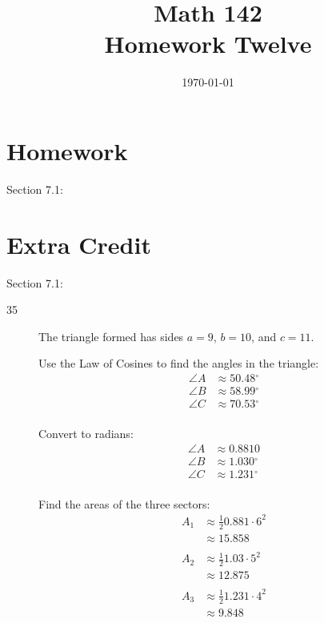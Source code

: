 \documentclass{exam}
\author{}
\date{\today}
\title{Math 142 \\ Homework Twelve}
\newcommand{\dg}{\ensuremath{^\circ}}
\begin{document}
  \maketitle

  \section{Homework}
  Section 7.1: 

  \section{Extra Credit}
  Section 7.1: 

  \ifprintanswers

    \begin{description}
      \item[35]
        The triangle formed has sides $a = 9$, $b = 10$, and $c = 11$.

        Use the Law of Cosines to find the angles in the triangle:
        \begin{align*}
          \angle A & \approx 50.48 \dg \\
          \angle B & \approx 58.99 \dg \\
          \angle C & \approx 70.53 \dg \\
        \end{align*}

        Convert to radians:
        \begin{align*}
          \angle A & \approx 0.8810 \\
          \angle B & \approx 1.030 \dg \\
          \angle C & \approx 1.231 \dg \\
        \end{align*}

        Find the areas of the three sectors:
        \begin{align*}
          A_1 & \approx \frac{1}{2} 0.881 \cdot 6^2 \\
              & \approx 15.858 \\
          \\
          A_2 & \approx \frac{1}{2} 1.03 \cdot 5^2 \\
              & \approx 12.875 \\
          \\
          A_3 & \approx \frac{1}{2} 1.231 \cdot 4^2 \\
              & \approx 9.848 \\
        \end{align*}


\end{description}
\end{document}
